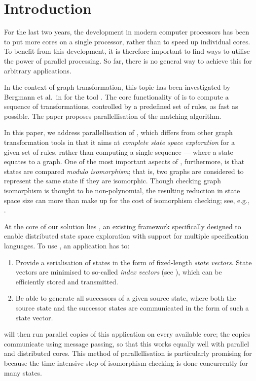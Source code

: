 \section{Introduction}

For the last two years, the development in modern computer processors has been
to put more cores on a single processor, rather than to speed up individual
cores. To benefit from this development, it is therefore important to find ways
to utilise the power of parallel processing. So far, there is no general way to
achieve this for arbitrary applications.

In the context of graph transformation, this topic has been investigated by
Bergmann et al.\ in \cite{BergmannRatVar2009} for the tool \VIATRA. The core
functionality of \VIATRA is to compute a sequence of transformations,
controlled by a predefined set of rules, as fast as possible. The paper
proposes parallellisation of the matching algorithm.

In this paper, we address parallellisation of \GROOVE \cite{GROOVE}, which
differs from other graph transformation tools in that it aims at \emph{complete
state space exploration} for a given set of rules, rather than computing a
single sequence --- where a state equates to a graph.  One of the most
important aspects of \GROOVE, furthermore, is that states are compared
\emph{modulo isomorphism}; that is, two graphs are considered to represent the
same state if they are isomorphic. Though checking graph isomorphism is thought
to be non-polynomial, the resulting reduction in state space size can more than
make up for the cost of isomorphism checking; see, e.g.,
\cite{CrouzenPolRen2008}.

At the core of our solution lies \LTSMIN \cite{BlomPolWeb2010},
an existing framework specifically designed to enable distributed state space
exploration with support for multiple specification languages.
To use \LTSMIN, an application has to:
%
\begin{enumerate}\noitemsep
\item Provide a serialisation of states in the form of fixed-length \emph{state
  vectors}. State vectors are minimised to so-called
  \emph{index vectors} (see \cite{Blom+2008}), which can be efficiently stored
  and transmitted.

\item Be able to generate all successors of a given source state,
  where both the source state and the successor states are communicated in the
  form of such a state vector.
\end{enumerate}
%
\LTSMIN will then run parallel copies of this application on every available
core; the copies communicate using message passing, so that this works equally
well with parallel and distributed cores. This method of parallellisation is
particularly promising for \GROOVE because the time-intensive step of
isomorphism checking is done concurrently for many states.

